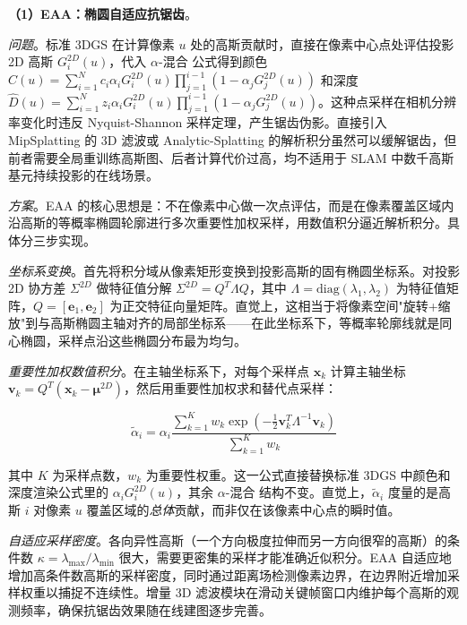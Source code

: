 \textbf{（1）EAA：椭圆自适应抗锯齿}。

\textit{问题}。标准 3DGS 在计算像素 $u$ 处的高斯贡献时，直接在像素中心点处评估投影 2D 高斯 $G_i^{2D}(u)$，代入 $\alpha$-混合 公式得到颜色 $C(u) = \sum_{i=1}^{N} c_i \alpha_i G_i^{2D}(u) \prod_{j=1}^{i-1}(1 - \alpha_j G_j^{2D}(u))$ 和深度 $\hat{D}(u) = \sum_{i=1}^{N} z_i \alpha_i G_i^{2D}(u) \prod_{j=1}^{i-1}(1 - \alpha_j G_j^{2D}(u))$。这种点采样在相机分辨率变化时违反 Nyquist-Shannon 采样定理，产生锯齿伪影。直接引入 MipSplatting 的 3D 滤波或 Analytic-Splatting 的解析积分虽然可以缓解锯齿，但前者需要全局重训练高斯图、后者计算代价过高，均不适用于 SLAM 中数千高斯基元持续投影的在线场景。

\textit{方案}。EAA 的核心思想是：不在像素中心做一次点评估，而是在像素覆盖区域内沿高斯的等概率椭圆轮廓进行多次重要性加权采样，用数值积分逼近解析积分。具体分三步实现。

\textit{坐标系变换}。首先将积分域从像素矩形变换到投影高斯的固有椭圆坐标系。对投影 2D 协方差 $\Sigma^{2D}$ 做特征值分解 $\Sigma^{2D} = Q^T \Lambda Q$，其中 $\Lambda = \mathrm{diag}(\lambda_1, \lambda_2)$ 为特征值矩阵，$Q = [\mathbf{e}_1, \mathbf{e}_2]$ 为正交特征向量矩阵。直觉上，这相当于将像素空间"旋转+缩放"到与高斯椭圆主轴对齐的局部坐标系——在此坐标系下，等概率轮廓线就是同心椭圆，采样点沿这些椭圆分布最为均匀。

\textit{重要性加权数值积分}。在主轴坐标系下，对每个采样点 $\mathbf{x}_k$ 计算主轴坐标 $\mathbf{v}_k = Q^T(\mathbf{x}_k - \boldsymbol{\mu}^{2D})$，然后用重要性加权求和替代点采样：

\begin{equation}
    \tilde{\alpha}_i = \alpha_i \frac{\sum_{k=1}^{K} w_k \exp\!\left(-\tfrac{1}{2} \mathbf{v}_k^T \Lambda^{-1} \mathbf{v}_k\right)}{\sum_{k=1}^{K} w_k}
\end{equation}

其中 $K$ 为采样点数，$w_k$ 为重要性权重。这一公式直接替换标准 3DGS 中颜色和深度渲染公式里的 $\alpha_i G_i^{2D}(u)$，其余 $\alpha$-混合 结构不变。直觉上，$\tilde{\alpha}_i$ 度量的是高斯 $i$ 对像素 $u$ 覆盖区域的\textit{总体}贡献，而非仅在该像素中心点的瞬时值。

\textit{自适应采样密度}。各向异性高斯（一个方向极度拉伸而另一方向很窄的高斯）的条件数 $\kappa = \lambda_{\max}/\lambda_{\min}$ 很大，需要更密集的采样才能准确近似积分。EAA 自适应地增加高条件数高斯的采样密度，同时通过距离场检测像素边界，在边界附近增加采样权重以捕捉不连续性。增量 3D 滤波模块在滑动关键帧窗口内维护每个高斯的观测频率，确保抗锯齿效果随在线建图逐步完善。

